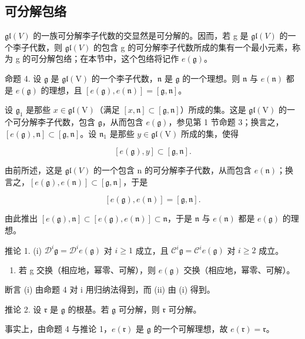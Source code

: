 \subsection{可分解包络}

\(\mathfrak{gl}(V)\) 的一族可分解李子代数的交显然是可分解的。因而，若 g 是 \(\mathfrak{gl}(V)\) 的一个李子代数，则 \(\mathfrak{gl}(V)\) 的包含 g 的可分解李子代数所成的集有一个最小元素，称为 g 的可分解包络；在本节中，这个包络将记作 \(e(\mathfrak{g})\)。

命题 4. 设 \(\mathfrak{g}\) 是 \(\mathfrak{gl}(\mathrm{V})\) 的一个李子代数，\(\mathfrak{n}\) 是 \(\mathfrak{g}\) 的一个理想。则 \(\mathfrak{n}\) 与 \(e(\mathfrak{n})\) 都是 \(e(\mathfrak{g})\) 的理想，且 \([e(\mathfrak{g}), e(\mathfrak{n})] = [\mathfrak{g}, \mathfrak{n}]\)。

设 \(\mathfrak{g}_1\) 是那些 \(x\in \mathfrak{gl}(\mathrm{V})\)（满足 \([x,\mathfrak{n}]\subset [\mathfrak{g},\mathfrak{n}]\)）所成的集。这是 \(\mathfrak{gl}(\mathrm{V})\) 的一个可分解李子代数，包含 \(\mathfrak{g}\)，从而包含 \(e(\mathfrak{g})\)，参见第 1 节命题 3；换言之，\([e(\mathfrak{g}),\mathfrak{n}]\subset [\mathfrak{g},\mathfrak{n}]\)。设 \(\mathfrak{n}_1\) 是那些 \(y\in \mathfrak{gl}(\mathrm{V})\) 所成的集，使得

\[
[ e (\mathfrak {g}), y ] \subset [ \mathfrak {g}, \mathfrak {n} ].
\]

由前所述，这是 \(\mathfrak{gl}(V)\) 的一个包含 n 的可分解李子代数，从而包含 \(e(\mathfrak{n})\)；换言之，\([e(\mathfrak{g}), e(\mathfrak{n})] \subset [\mathfrak{g}, \mathfrak{n}]\)，于是

\[
[ e (\mathfrak {g}), e (\mathfrak {n}) ] = [ \mathfrak {g}, \mathfrak {n} ].
\]

由此推出 \([e(\mathfrak{g}),\mathfrak{n}]\subset [e(\mathfrak{g}),e(\mathfrak{n})]\subset \mathfrak{n}\)，于是 \(\mathfrak{n}\) 与 \(e(\mathfrak{n})\) 都是 \(e(\mathfrak{g})\) 的理想。

推论 1. (i) \(\mathcal{D}^i\mathfrak{g} = \mathcal{D}^i e(\mathfrak{g})\) 对 \(i\geq 1\) 成立，且 \(\mathcal{C}^i\mathfrak{g} = \mathcal{C}^i e(\mathfrak{g})\) 对 \(i\geq 2\) 成立。

\begin{enumerate}
\def\labelenumi{(\roman{enumi})}
\setcounter{enumi}{1}
\tightlist
\item
  若 g 交换（相应地，幂零、可解），则 \(e(\mathfrak{g})\) 交换（相应地，幂零、可解）。
\end{enumerate}

断言 (i) 由命题 4 对 i 用归纳法得到，而 (ii) 由 (i) 得到。

推论 2. 设 \(\mathfrak{r}\) 是 \(\mathfrak{g}\) 的根基。若 \(\mathfrak{g}\) 可分解，则 \(\mathfrak{r}\) 可分解。

事实上，由命题 4 与推论 1，\(e(\mathfrak{r})\) 是 \(\mathfrak{g}\) 的一个可解理想，故 \(e(\mathfrak{r}) = \mathfrak{r}\)。

